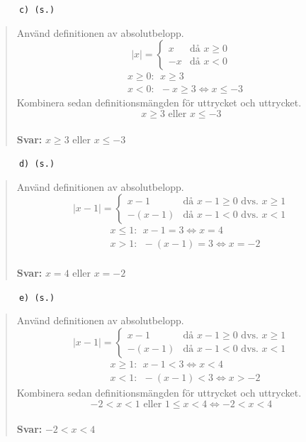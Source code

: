 \documentclass[a4paper]{article}
\newcommand{\tskcol}[1]{\textcolor{tskcol}{#1}}
\begin{document}
	\texttt{\tskcol{~~~~~~c) (s.)}}
	\begin{quotation}
		\noindent
		Använd definitionen av absolutbelopp.
		\[|x|=
		\begin{cases}
		x& \text{då } x \ge 0 \\
		-x& \text{då } x < 0
		\end{cases}\]
		\begin{align*}
		& x \ge 0:~~ x \ge 3 \\
		& x < 0:~~ -x \ge 3 \Leftrightarrow x \le -3
		\end{align*}
		Kombinera sedan definitionsmängden för uttrycket och uttrycket.
		\[x \ge 3 \text{ eller } x \le -3\]
		\\
		\textbf{Svar:} $x \ge 3$ eller $x \le -3$
	\end{quotation}
	
	\texttt{\tskcol{~~~~~~d) (s.)}}
	\begin{quotation}
		\noindent
		Använd definitionen av absolutbelopp.
		\[|x-1|=
		\begin{cases}
		x-1&    \text{då } x-1 \ge 0 \text{ dvs. } x \ge 1\\
		-(x-1)& \text{då } x-1 < 0   \text{ dvs. } x < 1
		\end{cases}\]
		\begin{align*}
		& x \le 1:~~ x-1=3 \Leftrightarrow x=4 \\
		& x > 1:~~ -(x-1)=3 \Leftrightarrow x=-2
		\end{align*}
		\\
		\textbf{Svar:} $x=4$ eller $x=-2$
	\end{quotation}
	
	\texttt{\tskcol{~~~~~~e) (s.)}}
	\begin{quotation}
		\noindent
		Använd definitionen av absolutbelopp.
		\[|x-1|=
		\begin{cases}
		x-1&    \text{då } x-1 \ge 0 \text{ dvs. } x \ge 1\\
		-(x-1)& \text{då } x-1 < 0   \text{ dvs. } x < 1
		\end{cases}\]
		\begin{align*}
		& x \ge 1:~~ x-1 < 3 \Leftrightarrow x < 4\\
		& x < 1:~~ -(x-1) < 3 \Leftrightarrow x > -2
		\end{align*}
		Kombinera sedan definitionsmängden för uttrycket och uttrycket.
		\[-2 < x < 1 \text{ eller } 1 \le x < 4 \Leftrightarrow -2 < x < 4\]
		\\
		\textbf{Svar:} $-2 < x < 4$
	\end{quotation}
	
\end{document}
